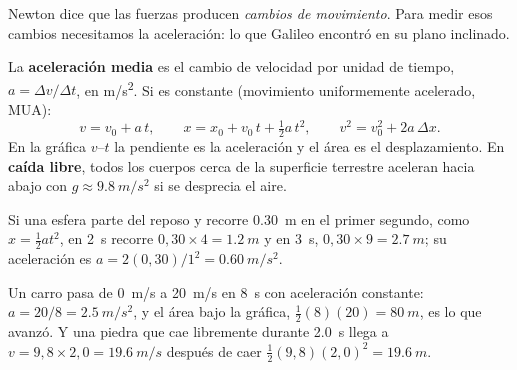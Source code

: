 \documentclass[11pt]{article}
\begin{document}
\label{tema:cinematica}

\begin{hilo}
Newton dice que las fuerzas producen \emph{cambios de movimiento}. Para medir esos cambios
necesitamos la aceleración: lo que Galileo encontró en su plano inclinado.
\end{hilo}

La \textbf{aceleración media} es el cambio de velocidad por unidad de tiempo,
$a = \Delta v/\Delta t$, en \unit{m/s^2}. Si es constante (movimiento uniformemente
acelerado, MUA):
\[
  v = v_0 + a\,t, \qquad x = x_0 + v_0\,t + \tfrac{1}{2}a\,t^2, \qquad v^2 = v_0^2 + 2a\,\Delta x.
\]
En la gráfica $v$--$t$ la pendiente es la aceleración y el área es el desplazamiento. En
\textbf{caída libre}, todos los cuerpos cerca de la superficie terrestre aceleran hacia abajo
con $g \approx \qty{9,8}{m/s^2}$ si se desprecia el aire.

\begin{ejemplo}
Si una esfera parte del reposo y recorre \qty{0,30}{m} en el primer segundo, como
$x = \frac{1}{2}at^2$, en \qty{2}{s} recorre $0{,}30 \times 4 = \qty{1,2}{m}$ y en \qty{3}{s},
$0{,}30 \times 9 = \qty{2,7}{m}$; su aceleración es $a = 2(0{,}30)/1^2 = \qty{0,60}{m/s^2}$.
\end{ejemplo}

\begin{ejemplo}
Un carro pasa de \qty{0}{m/s} a \qty{20}{m/s} en \qty{8}{s} con aceleración constante:
$a = 20/8 = \qty{2,5}{m/s^2}$, y el área bajo la gráfica, $\frac{1}{2}(8)(20) = \qty{80}{m}$, es
lo que avanzó. Y una piedra que cae libremente durante \qty{2,0}{s} llega a
$v = 9{,}8 \times 2{,}0 = \qty{19,6}{m/s}$ después de caer
$\frac{1}{2}(9{,}8)(2{,}0)^2 = \qty{19,6}{m}$.
\begin{center}
\end{center}
\end{ejemplo}
\end{document}
